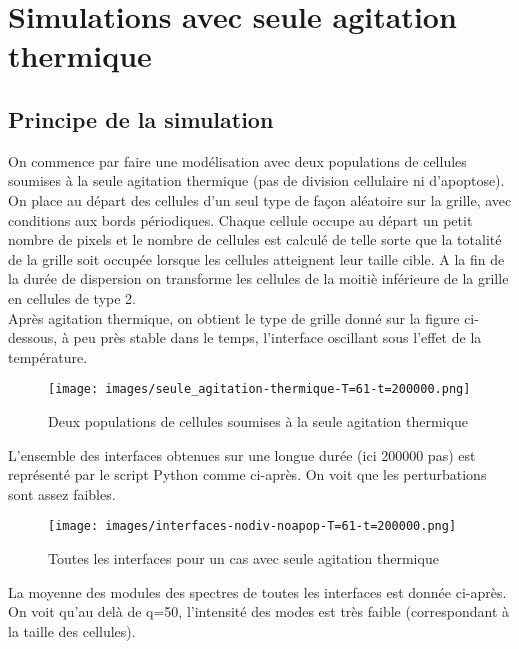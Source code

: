 \documentclass[11pt,a4paper]{article}
\begin{document}
\section{Simulations avec seule agitation thermique}

\subsection{Principe de la simulation}

On commence par faire une modélisation avec deux populations de cellules soumises à la seule agitation thermique (pas de division cellulaire ni d'apoptose).\\
On place au départ des cellules d'un seul type de façon aléatoire sur la grille, avec conditions aux bords périodiques. Chaque cellule occupe au départ un petit nombre de pixels et le nombre de cellules est calculé de telle sorte que la totalité de la grille soit occupée lorsque les cellules atteignent leur taille cible. A la fin de la durée de dispersion on transforme les cellules de la moitiè inférieure de la grille en cellules de type 2.\\
Après agitation thermique, on obtient le type de grille donné sur la figure ci-dessous, à peu près stable dans le temps, l'interface oscillant sous l'effet de la température.\\

\begin{figure}[H]
\begin{center}
\texttt{[image: images/seule\_agitation-thermique-T=61-t=200000.png]}
\caption{Deux populations de cellules soumises à la seule agitation thermique}
\label{mafigure}
\end{center}
\end{figure}

L'ensemble des interfaces obtenues sur une longue durée (ici 200000 pas) est représenté par le script Python comme ci-après. On voit que les perturbations sont assez faibles.

\begin{figure}[H]
\begin{center}
\texttt{[image: images/interfaces-nodiv-noapop-T=61-t=200000.png]}
\caption{Toutes les interfaces pour un cas avec seule agitation thermique}
\label{mafigure}
\end{center}
\end{figure}

La moyenne des modules des spectres de toutes les interfaces est donnée ci-après. On voit qu'au delà de q=50, l'intensité des modes est très faible (correspondant à la taille des cellules).
\end{document}
